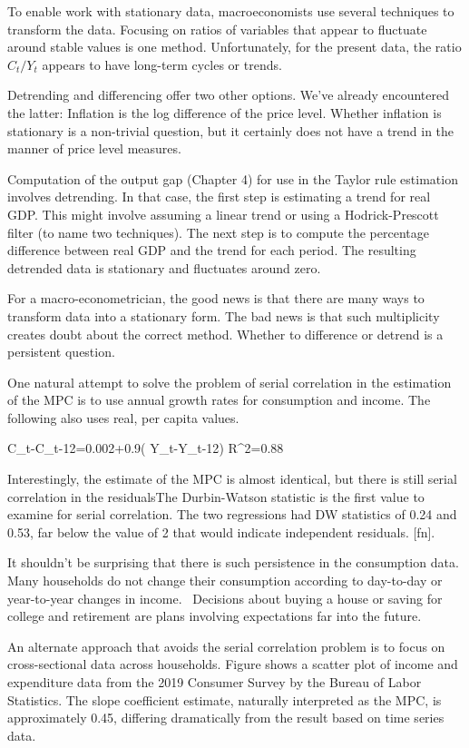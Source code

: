 ﻿\documentclass[oneside]{book}
\begin{document}
To enable work with stationary data, macroeconomists use several
techniques to transform the data. Focusing on ratios of variables that
appear to fluctuate around stable values is one method. Unfortunately, for
the present data, the ratio $C_{t}/Y_{t}$ appears to have long-term cycles or trends.

Detrending and differencing offer two other options. We've already
encountered the latter: Inflation is the log difference of the price
level. Whether inflation is stationary is a non-trivial question, but it
certainly does not have a trend in the manner of price level measures.

Computation of the output gap (Chapter 4) for use in the Taylor rule estimation involves detrending. In that case, the first step is estimating a trend for real GDP. This might involve assuming a linear trend or using a Hodrick-Prescott
filter (to name two techniques). The next step is to compute the percentage
difference between real GDP and the trend for each period. The resulting
detrended data is stationary and fluctuates around zero.

For a macro-econometrician, the good news is that there are many ways to
transform data into a stationary form. The bad news is that such multiplicity creates doubt about the correct method. Whether to difference or detrend is a persistent question.

One natural attempt to solve the problem of serial correlation in the
estimation of the MPC is to use annual growth rates for consumption and
income. The following also uses real, per capita values.



\log C_{t}-\log C_{t-12}=0.002+0.9( \log Y_{t}-\log Y_{t-12})
\text{ \ \ }R^{2}=0.88


Interestingly, the estimate of the MPC is almost identical, but there is
still serial correlation in the residualsThe Durbin-Watson statistic is the first value to examine for serial
correlation. The two regressions had DW statistics of 0.24 and 0.53, far
below the value of 2 that would indicate independent residuals. [fn].

It shouldn't be surprising that there is such
persistence in the consumption data. Many households do not change their
consumption according to day-to-day or year-to-year changes in income. \
Decisions about buying a house or saving for college and retirement are
plans involving expectations far into the future.

An alternate approach that avoids the serial correlation problem is to focus
on cross-sectional data across households. Figure  shows a scatter plot of income and expenditure data from the 2019 Consumer Survey by the Bureau of Labor Statistics. The slope coefficient estimate, naturally interpreted as the MPC, is approximately 0.45, differing dramatically from the result based on time series data.
\end{document}
